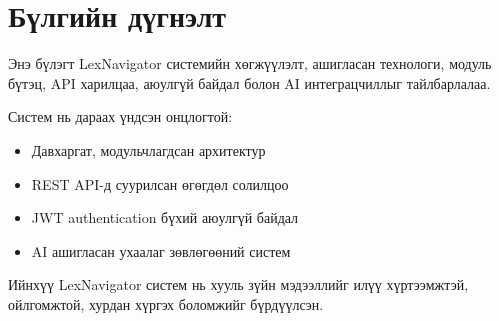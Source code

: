 
\section{Бүлгийн дүгнэлт}

Энэ бүлэгт LexNavigator системийн хөгжүүлэлт, ашигласан технологи, модуль бүтэц, API харилцаа, аюулгүй байдал болон AI интеграцчиллыг тайлбарлалаа.

Систем нь дараах үндсэн онцлогтой:

\begin{itemize}
    \item Давхаргат, модульчлагдсан архитектур
    \item REST API-д суурилсан өгөгдөл солилцоо
    \item JWT authentication бүхий аюулгүй байдал
    \item AI ашигласан ухаалаг зөвлөгөөний систем
\end{itemize}

Ийнхүү LexNavigator систем нь хууль зүйн мэдээллийг илүү хүртээмжтэй, ойлгомжтой, хурдан хүргэх боломжийг бүрдүүлсэн.